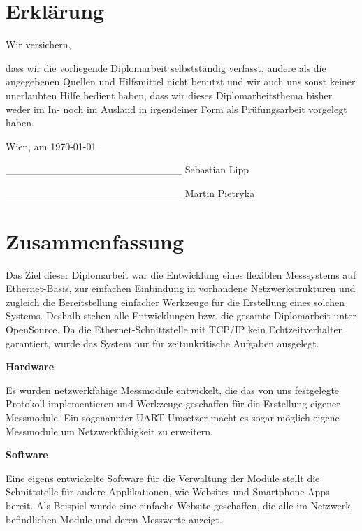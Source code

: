 \documentclass[a4paper,14pt,headsepline]{scrartcl}
\begin{document}
\newpage

\onehalfspacing

\section*{Erklärung}
Wir versichern,

dass wir die vorliegende Diplomarbeit selbstständig verfasst, andere als die angegebenen Quellen und Hilfsmittel nicht benutzt und wir auch uns sonst keiner unerlaubten Hilfe bedient haben, dass wir dieses Diplomarbeitsthema bisher weder im In- noch im Ausland in irgendeiner Form als Prüfungsarbeit vorgelegt haben. 

Wien, am \today

\_\_\_\_\_\_\_\_\_\_\_\_\_\_\_\_\_\_\_\_\_\_\_\_   \newline Sebastian Lipp 

\_\_\_\_\_\_\_\_\_\_\_\_\_\_\_\_\_\_\_\_\_\_\_\_   \newline Martin Pietryka

\newpage

\section*{Zusammenfassung}
Das Ziel dieser Diplomarbeit war die Entwicklung eines flexiblen Messsystems auf Ethernet-Basis, zur einfachen Einbindung in vorhandene Netzwerkstrukturen und zugleich die Bereitstellung einfacher Werkzeuge für die Erstellung eines solchen Systems. Deshalb stehen alle Entwicklungen bzw. die gesamte Diplomarbeit unter OpenSource. Da die Ethernet-Schnittstelle mit TCP/IP kein Echtzeitverhalten garantiert, wurde das System nur für zeitunkritische Aufgaben ausgelegt. 

\textbf{Hardware}

Es wurden netzwerkfähige Messmodule entwickelt, die das von uns festgelegte Protokoll implementieren und Werkzeuge geschaffen für die Erstellung eigener Messmodule. Ein sogenannter UART-Umsetzer macht es sogar möglich eigene Messmodule um Netzwerkfähigkeit zu erweitern. 

\textbf{Software}

Eine eigens entwickelte Software für die Verwaltung der Module stellt die Schnittstelle für andere Applikationen, wie Websites und Smartphone-Apps bereit. Als Beispiel wurde eine einfache Website geschaffen, die alle im Netzwerk befindlichen Module und deren Messwerte anzeigt. 

\newpage
\end{document}
